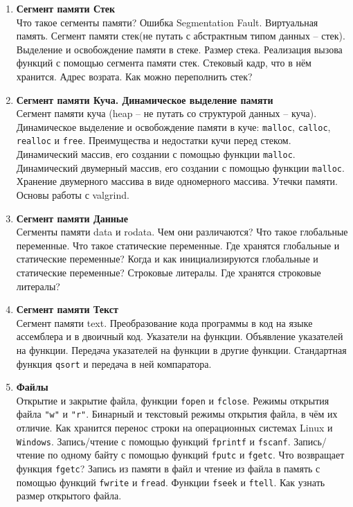 \documentclass{article}
\begin{document}
\begin{enumerate}
\item \textbf{Сегмент памяти Стек}\\
Что такое сегменты памяти? Ошибка Segmentation Fault. Виртуальная память. Сегмент памяти стек(не путать с абстрактным типом данных -- стек). Выделение и освобождение памяти в стеке. Размер стека. Реализация вызова функций с помощью сегмента памяти стек. Стековый кадр, что в нём хранится. Адрес возрата.  Как можно переполнить стек?  

\item \textbf{Сегмент памяти Куча. Динамическое выделение памяти}\\
Сегмент памяти куча (heap -- не путать со структурой данных -- куча).
Динамическое выделение и освобождение памяти в куче: \texttt{malloc}, \texttt{calloc}, \texttt{realloc} и \texttt{free}. Преимущества и недостатки кучи перед стеком. Динамический массив, его создании с помощью функции \texttt{malloc}. Динамический двумерный массив, его создании с помощью функции \texttt{malloc}. Хранение двумерного массива в виде одномерного массива. Утечки памяти. Основы работы с valgrind.

\item \textbf{Сегмент памяти Данные}\\
Сегменты памяти data и rodata. Чем они различаются? Что такое глобальные переменные. Что такое статические переменные. Где хранятся глобальные и статические переменные? Когда и как инициализируются глобальные и статические переменные? Строковые литералы. Где хранятся строковые литералы?


\item \textbf{Сегмент памяти Текст}\\
Сегмент памяти text. Преобразование кода программы в код на языке ассемблера и в двоичный код. Указатели на функции. Объявление указателей на функции. Передача указателей на функции в другие функции. Стандартная функция \texttt{qsort} и передача в ней компаратора.


\item \textbf{Файлы}\\
Открытие и закрытие файла, функции \texttt{fopen} и \texttt{fclose}. Режимы открытия файла \texttt{"w"} и \texttt{"r"}. Бинарный и текстовый режимы открытия файла, в чём их отличие. Как хранится перенос строки на операционных системах Linux и \texttt{Windows}. Запись/чтение с помощью функций \texttt{fprintf} и \texttt{fscanf}. Запись/чтение по одному байту с помощью функций \texttt{fputc} и \texttt{fgetc}. Что возвращает функция \texttt{fgetc}? Запись из памяти в файл и чтение из файла в память с помощью функций \texttt{fwrite} и \texttt{fread}. Функции \texttt{fseek} и \texttt{ftell}. Как узнать размер открытого файла.


\end{enumerate}
\end{document}
